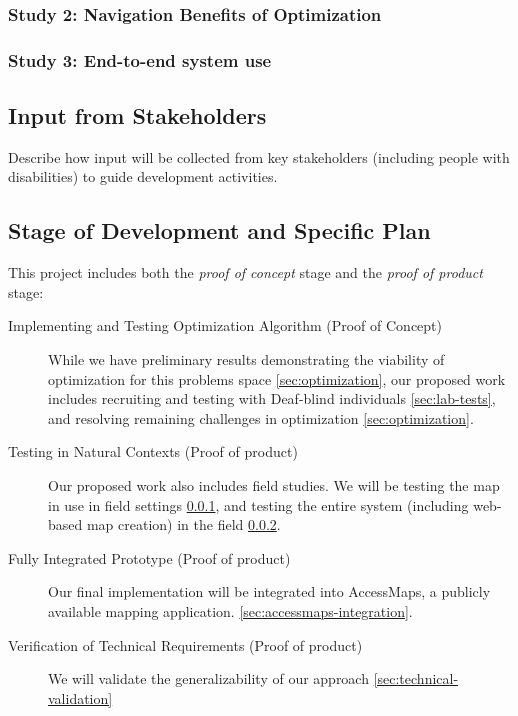 \subsubsection{Study 2: Navigation Benefits of Optimization}
\label{sec:field-map}

\subsubsection{Study 3: End-to-end system use}
\label{sec:field-web}

\subsection{Input from Stakeholders}
Describe how input will be collected from key stakeholders (including people with disabilities) to guide development activities.

\subsection{Stage of Development and Specific Plan}

This project includes both the \textit{proof of concept} stage and the \textit{proof of product} stage:
\begin{description}
\item[Implementing and Testing Optimization Algorithm (Proof of Concept)] While we have preliminary results demonstrating the viability of optimization for this problems space \ref{sec:optimization}, our proposed work includes recruiting and testing with Deaf-blind individuals \ref{sec:lab-tests}, and resolving remaining challenges in optimization \ref{sec:optimization}.
\item[Testing in Natural Contexts (Proof of product)] Our proposed work also includes field studies. We will be testing the map in use in field settings \ref{sec:field-map}, and testing the entire system (including web-based map creation) in the field \ref{sec:field-web}. 
\item[Fully Integrated Prototype (Proof of product)]
Our final implementation will be integrated into AccessMaps, a publicly available mapping application. \ref{sec:accessmaps-integration}.
\item[Verification of Technical Requirements (Proof of product)]
We will validate the generalizability of our approach  \ref{sec:technical-validation}
\end{description}
    
